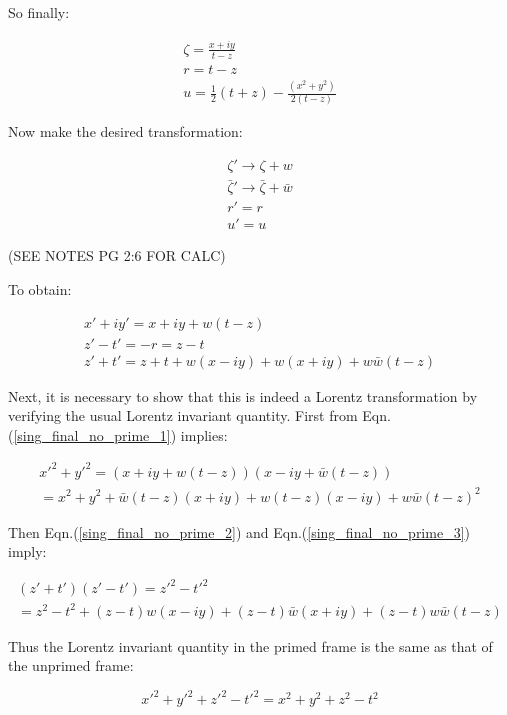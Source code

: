\noindent So finally:

\begin{eqnarray*}
\zeta = \frac{x + i y}{t-z} \\
r = t - z \\
u = \frac{1}{2} (t + z) - \frac{(x^2 + y^2)}{2(t - z)}
\end{eqnarray*}

Now make the desired transformation:

\begin{eqnarray*}
\zeta' \rightarrow \zeta + w \\
\bar{\zeta}' \rightarrow \bar{\zeta} + \bar{w} \\
r' = r \\
u' = u
\end{eqnarray*}

(SEE NOTES PG 2:6 FOR CALC)

\noindent To obtain:

\begin{eqnarray}
x' + i y' = x + iy + w(t-z) \label{sing_final_no_prime_1} \\
z' - t' = -r = z - t \label{sing_final_no_prime_2} \\
z' + t' = z+t + w(x - i y) + w(x + iy) + w\bar{w} (t-z) \label{sing_final_no_prime_3}
\end{eqnarray}

Next, it is necessary to show that this is indeed a Lorentz transformation by verifying the usual Lorentz invariant quantity. First from Eqn.(\ref{sing_final_no_prime_1}) implies:

\begin{eqnarray*}
{x'}^2 + {y'}^2 = (x + iy + w(t-z))(x - iy + \bar{w}(t-z)) \\
= x^2 + y^2 + \bar{w}(t - z)(x+iy) + w(t-z)(x-iy) + w\bar{w}{(t-z)}^2
\end{eqnarray*}

Then Eqn.(\ref{sing_final_no_prime_2}) and Eqn.(\ref{sing_final_no_prime_3}) imply:

\begin{eqnarray*}
(z' + t')(z' - t') = {z'}^2 - {t'}^2 \\
= z^2 - t^2 + (z - t)w(x-iy) + (z-t)\bar{w}(x+iy) + (z -t)w\bar{w}(t-z)
\end{eqnarray*}

\noindent Thus the Lorentz invariant quantity in the primed frame is the same as that of the unprimed frame:

\begin{equation*} 
{x'}^2 + {y'}^2 + {z'}^2 - {t'}^2 = {x}^2 + {y}^2 + {z}^2 - {t}^2
\end{equation*} 

